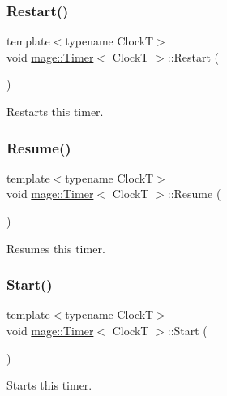 \subsubsection{\texorpdfstring{Restart()}{Restart()}}
{\footnotesize\ttfamily template$<$typename ClockT$>$ \\
void \hyperlink{classmage_1_1_timer}{mage\+::\+Timer}$<$ ClockT $>$\+::Restart (\begin{DoxyParamCaption}{ }\end{DoxyParamCaption})\hspace{0.3cm}{\ttfamily [noexcept]}}

Restarts this timer. \hypertarget{classmage_1_1_timer_a8464b2ea3fb3d97eac5ccb3a5b02e47b}{}\label{classmage_1_1_timer_a8464b2ea3fb3d97eac5ccb3a5b02e47b} 
\subsubsection{\texorpdfstring{Resume()}{Resume()}}
{\footnotesize\ttfamily template$<$typename ClockT$>$ \\
void \hyperlink{classmage_1_1_timer}{mage\+::\+Timer}$<$ ClockT $>$\+::Resume (\begin{DoxyParamCaption}{ }\end{DoxyParamCaption})\hspace{0.3cm}{\ttfamily [noexcept]}}

Resumes this timer. \hypertarget{classmage_1_1_timer_a633908e9e816e9397cd93b65bc11ddb3}{}\label{classmage_1_1_timer_a633908e9e816e9397cd93b65bc11ddb3} 
\subsubsection{\texorpdfstring{Start()}{Start()}}
{\footnotesize\ttfamily template$<$typename ClockT$>$ \\
void \hyperlink{classmage_1_1_timer}{mage\+::\+Timer}$<$ ClockT $>$\+::Start (\begin{DoxyParamCaption}{ }\end{DoxyParamCaption})\hspace{0.3cm}{\ttfamily [noexcept]}}

Starts this timer. \hypertarget{classmage_1_1_timer_ab9442d64c2c1bedec830004f292725ab}{}\label{classmage_1_1_timer_ab9442d64c2c1bedec830004f292725ab} 
